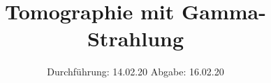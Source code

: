 

\subject{V14}
\title{Tomographie mit Gamma-Strahlung}
\date{%
  Durchführung: 14.02.20
  \hspace{3em}
  Abgabe: 16.02.20
}



\maketitle
\thispagestyle{empty}
\tableofcontents
\newpage








\printbibliography{}


